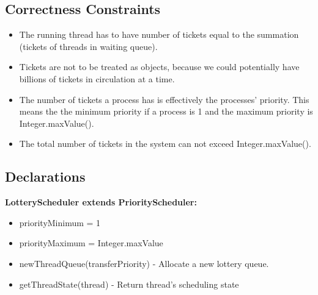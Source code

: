 \documentclass{article}
\begin{document}
\subsection{Correctness Constraints}

\begin{itemize}

\item The running thread has to have number of tickets equal to the summation (tickets of threads in waiting queue).
\item Tickets are not to be treated as objects, because we could potentially have billions of tickets in circulation at a time.
\item The number of tickets a process has is effectively the processes' priority. This means the the minimum priority if a process is 1 and the maximum priority is Integer.maxValue().
\item The total number of tickets in the system can not exceed Integer.maxValue().
\end{itemize}

\subsection{Declarations}

\textbf{LotteryScheduler extends PriorityScheduler:}\begin{itemize}

\item {\ttfamily priorityMinimum = 1}
\item {\ttfamily priorityMaximum = Integer.maxValue}
\item {\ttfamily newThreadQueue(transferPriority)} - Allocate a new lottery queue.
\item {\ttfamily getThreadState(thread)} - Return thread's scheduling state
\end{itemize}
\end{document}
